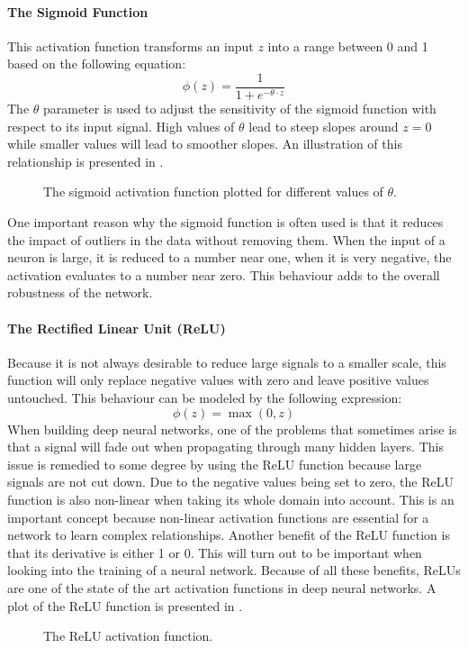 \paragraph{The Sigmoid Function}
\label{sec:sigmoid}
This activation function transforms an input \(z\) into a range between 0
and 1 based on the following equation:
\begin{equation}
  \phi(z) = \frac{1}{1 + e^{-\theta \cdot z}}
\end{equation}
The \(\theta\) parameter is used to adjust the sensitivity of the
sigmoid function with respect to its input signal. High values of \(\theta\) lead
to steep slopes around \(z=0\) while smaller values will lead to smoother
slopes. An illustration of this relationship is presented in .
\begin{figure}[h]
  \centering
  
  \caption{The sigmoid activation function plotted for different
    values of \(\theta\).}
  \label{fig:sigmoid}
\end{figure}

One important reason why the sigmoid function is often used is that it reduces
the impact of outliers in the data without removing them. When the
input of a neuron is large, it is reduced to a number near one, when it
is very negative, the activation evaluates to a number near zero. This
behaviour adds to the overall robustness of the network.

\paragraph{The Rectified Linear Unit (ReLU)}
Because it is not always desirable to reduce large signals to a
smaller scale, this function will only replace negative values with
zero and leave positive values untouched. This behaviour can be
modeled by the following expression:
\begin{equation}
  \phi(z) = \max(0, z)
\end{equation}
When building deep neural networks, one of the problems that sometimes
arise is that a signal will fade out when propagating through many
hidden layers. This issue is remedied to some degree by using the ReLU
function because large signals are not cut down. Due to the negative
values being set to zero, the ReLU function is also non-linear when
taking its whole domain into account. This is an important concept
because non-linear activation functions are essential for a network to
learn complex relationships. Another benefit of the ReLU function is
that its derivative is either 1 or 0. This will turn out to be important when
looking into the training of a neural network. Because of all these benefits,
ReLUs are one of the state of the art activation functions in deep
neural networks. A plot of the ReLU function is presented in .
\begin{figure}[h]
  \centering
  
  \caption{The ReLU activation function.}
  \label{fig:relu}
\end{figure}

